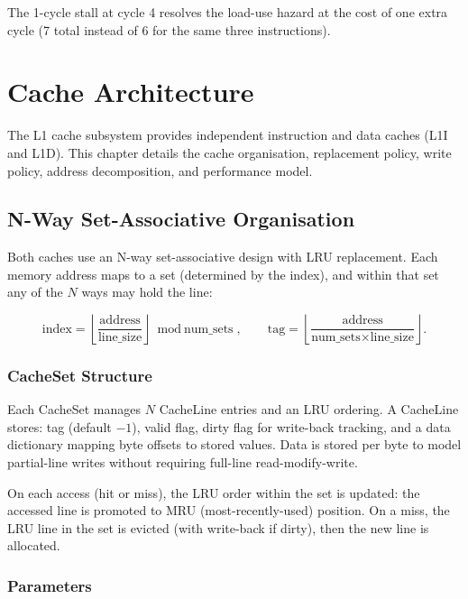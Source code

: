 \documentclass[12pt,a4paper,twoside]{book}
\theoremstyle{trinarytheorem}
\theoremstyle{trinarydefinition}
\newcommand{\code}[1]{\textsf{#1}}
\begin{document}
The 1-cycle stall at cycle 4 resolves the load-use hazard at the cost
of one extra cycle (7 total instead of 6 for the same three instructions).

\chapter{Cache Architecture}
\label{ch:cache-arch}

The L1 cache subsystem provides independent instruction and data caches
(L1I and L1D). This chapter details the cache organisation, replacement
policy, write policy, address decomposition, and performance model.

\section{N-Way Set-Associative Organisation}

Both caches use an N-way set-associative design with LRU replacement.
Each memory address maps to a set (determined by the index), and within
that set any of the $N$ ways may hold the line:

\[
\text{index} = \left\lfloor\frac{\text{address}}{\text{line\_size}}\right\rfloor
\bmod \text{num\_sets},\qquad
\text{tag} = \left\lfloor\frac{\text{address}}{\text{num\_sets} \times
\text{line\_size}}\right\rfloor.
\]

\subsection{CacheSet Structure}

Each \code{CacheSet} manages $N$ \code{CacheLine} entries and an LRU ordering.
A \code{CacheLine} stores: \code{tag} (default $-1$),
\code{valid} flag, \code{dirty} flag for write-back tracking,
and a \code{data} dictionary mapping byte offsets to stored values.
Data is stored per byte to model partial-line writes without requiring
full-line read-modify-write.

On each access (hit or miss), the LRU order within the set is updated:
the accessed line is promoted to MRU (most-recently-used) position.
On a miss, the LRU line in the set is evicted (with write-back if dirty),
then the new line is allocated.

\subsection{Parameters}
\end{document}
